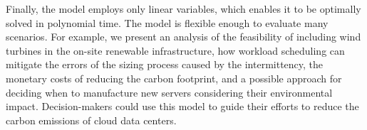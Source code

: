 Finally, the model employs only linear variables, which enables it to be optimally solved in polynomial time. The model is flexible enough to evaluate many scenarios. For example, we present an analysis of the feasibility of including wind turbines in the on-site renewable infrastructure, how workload scheduling can mitigate the errors of the sizing process caused by the intermittency, the monetary costs of reducing the carbon footprint, and a possible approach for deciding when to manufacture new servers considering their environmental impact. Decision-makers could use this model to guide their efforts to reduce the carbon emissions of cloud data centers. 

